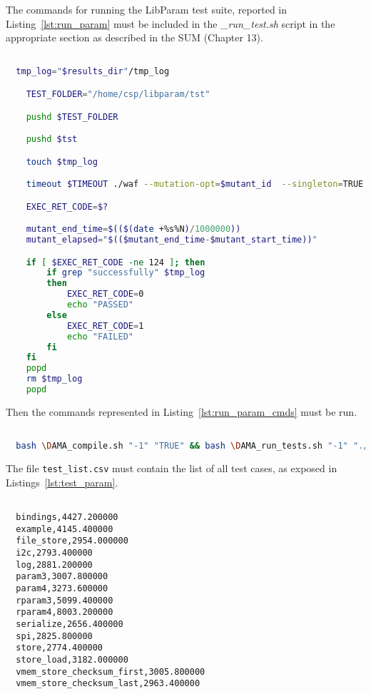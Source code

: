 The commands for running the LibParam test suite, reported in Listing~\ref{lst:run_param} must be included in the \emph{\DAMA\_run\_test.sh} script in the appropriate section as described in the SUM (Chapter 13).


  \begin{lstlisting}[language=bash, label={lst:run_param}]

  tmp_log="$results_dir"/tmp_log

    TEST_FOLDER="/home/csp/libparam/tst"

    pushd $TEST_FOLDER

    pushd $tst

    touch $tmp_log

    timeout $TIMEOUT ./waf --mutation-opt=$mutant_id  --singleton=TRUE 2>&1 | tee $tmp_log

    EXEC_RET_CODE=$?

    mutant_end_time=$(($(date +%s%N)/1000000))
    mutant_elapsed="$(($mutant_end_time-$mutant_start_time))"

    if [ $EXEC_RET_CODE -ne 124 ]; then
        if grep "successfully" $tmp_log
        then
            EXEC_RET_CODE=0
            echo "PASSED"
        else
            EXEC_RET_CODE=1
            echo "FAILED"
        fi
    fi
    popd
    rm $tmp_log
    popd

  \end{lstlisting}

Then the commands represented in Listing~\ref{lst:run_param_cmds} must be run.


  \begin{lstlisting}[language=bash, label={lst:run_param_cmds}]

  bash \DAMA_compile.sh "-1" "TRUE" && bash \DAMA_run_tests.sh "-1" "./test_list.csv" "./"

  \end{lstlisting}

The file \texttt{test\_list.csv} must contain the list of all test cases, as exposed in Listings~\ref{lst:test_param}.

  \begin{lstlisting}[label={lst:test_param}]

  bindings,4427.200000
  example,4145.400000
  file_store,2954.000000
  i2c,2793.400000
  log,2881.200000
  param3,3007.800000
  param4,3273.600000
  rparam3,5099.400000
  rparam4,8003.200000
  serialize,2656.400000
  spi,2825.800000
  store,2774.400000
  store_load,3182.000000
  vmem_store_checksum_first,3005.800000
  vmem_store_checksum_last,2963.400000

  \end{lstlisting}

